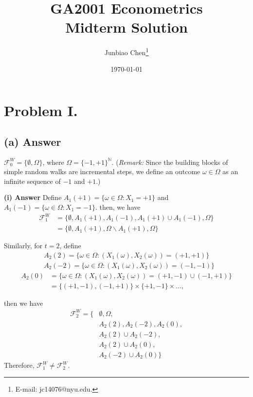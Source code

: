 \documentclass[11pt]{article}
\title{GA2001 Econometrics \\Midterm Solution}
\author{
Junbiao Chen\thanks{E-mail: jc14076@nyu.edu.}
}
\date{\today}
\theoremstyle{definition}
\theoremstyle{boldtitle} %
\numberwithin{equation}{section}
\numberwithin{figure}{section}
\numberwithin{table}{section}
\begin{document}
\maketitle

\section{Problem I.}
\subsection{(a) Answer}
$\mathcal{F}_0^W = \{\emptyset, \Omega \}$,
where $\Omega = \{-1, +1\}^\mathbb{N}$.
(\textit{Remark:} Since the building blocks of simple random walks are incremental steps, 
we define an outcome $\omega \in \Omega$ as an infinite sequence of $-1$ and $+1$.)

\vspace{10mm}

\noindent \textbf{(i) Answer}
Define $A_1(+1) = \{\omega \in \Omega: X_1 = +1\}$ and
$A_1(-1) = \{\omega \in \Omega: X_1 = -1\}$.
then, we have 
\begin{align*}
\mathcal{F}_1^W & = \{\emptyset, A_1(+1), A_1(-1), A_1(+1) \cup A_1(-1),\Omega \} \\ 
& = \{\emptyset, A_1(+1), \Omega \backslash A_1(+1), \Omega \}
\end{align*}

Similarly, for $t = 2$, 
define 
\begin{align}
  & A_2(2) = \{\omega \in \Omega: (X_1(\omega), X_2(\omega)) = (+1, +1)  \} \\
  & A_2(-2) = \{\omega \in \Omega: (X_1(\omega), X_2(\omega)) = (-1, -1)  \}
\end{align}
\begin{equation}
  \begin{aligned}
  A_2(0) & = \{\omega \in \Omega: (X_1(\omega), X_2(\omega)) = (+1, -1) \cup  (-1, +1)  \} \\ 
    & = \{(+1, -1), (-1, +1) \} \times \{+1, -1\} \times ... ,
\end{aligned}
\end{equation}

then we have 
\begin{align*}
\mathcal{F}_2^W = \{& \emptyset, \Omega, \\ 
  & A_2(2), A_2(-2), A_2(0), \\
  & A_2(2) \cup A_2(-2), \\
  & A_2(2) \cup A_2(0),  \\ 
  & A_2(-2) \cup A_2(0) \}
\end{align*}
Therefore, $\mathcal{F}_1^W \neq \mathcal{F}_2^W$.
\end{document}
